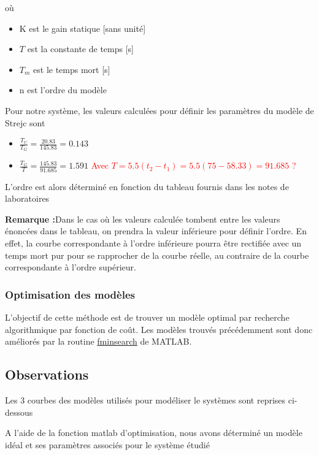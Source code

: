 où 
\begin{itemize}
\item K est le gain statique [sans unité]
\item $T$ est la constante de temps [s]
\item $T_{m}$ est le temps mort [s] 
\item n est l'ordre du modèle
\end{itemize}

Pour notre système, les valeurs calculées pour définir les paramètres du modèle de Strejc sont
\begin{itemize}
\item $\frac{T_{U}}{T_{G}} = \frac{20.83}{145.83} = 0.143$
\item $\frac{T_{G}}{T} = \frac{145.83}{91.685} = 1.591 $
\textcolor{red}{Avec $T = 5.5 (t_{2} - t_{1}) = 5.5 (75 - 58.33) = 91.685$ ?}
\end{itemize}

L'ordre est alors déterminé en fonction du tableau fournis dans les notes de laboratoires 

\textbf{Remarque :}Dans le cas où les valeurs calculée tombent entre les valeurs énoncées dans le tableau, on prendra la valeur inférieure pour définir l'ordre. En effet, la courbe correspondante à l'ordre inférieure pourra être rectifiée avec un temps mort pur pour se rapprocher de la courbe réelle, au contraire de la courbe correspondante à l'ordre supérieur. 

\subsubsection{Optimisation des modèles}
L'objectif de cette méthode est de trouver un modèle optimal par recherche algorithmique par fonction de coût. Les modèles trouvés précédemment sont donc améliorés par la routine \url{fminsearch} de MATLAB.


\subsection{Observations}
Les 3 courbes des modèles utilisés pour modéliser le systèmes sont reprises ci-dessous


A l'aide de la fonction matlab d'optimisation, nous avons déterminé un modèle idéal et ses paramètres associés pour le système étudié


